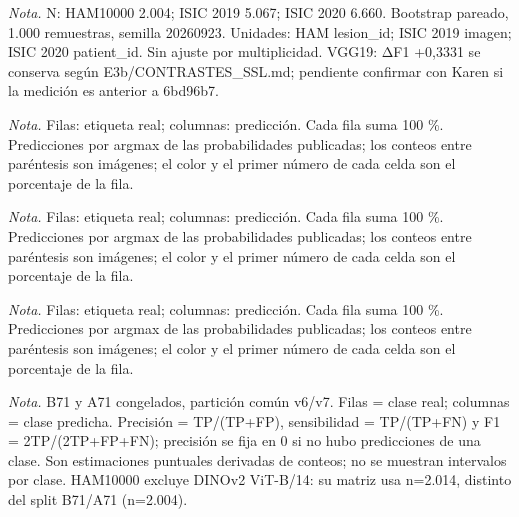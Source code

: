 \caption{C2: diferencias pareadas de F1 macro entre B71 y los controles con predicciones sobre las mismas imágenes. Panel (a), HAM10000, compara ocho baselines congelados; panel (b), ISIC, compara el control público B71.}
\textit{Nota.} N: HAM10000 2.004; ISIC 2019 5.067; ISIC 2020 6.660. Bootstrap pareado, 1.000 remuestras, semilla 20260923. Unidades: HAM lesion\_id; ISIC 2019 imagen; ISIC 2020 patient\_id. Sin ajuste por multiplicidad. VGG19: ΔF1 +0,3331 se conserva según E3b/CONTRASTES\_SSL.md; pendiente confirmar con Karen si la medición es anterior a 6bd96b7.

\caption{Matriz de confusión de B71 (propuesto) en HAM10000 (n = 2.004), evaluación congelada, normalizada por clase real.}
\textit{Nota.} Filas: etiqueta real; columnas: predicción. Cada fila suma 100 \%. Predicciones por argmax de las probabilidades publicadas; los conteos entre paréntesis son imágenes; el color y el primer número de cada celda son el porcentaje de la fila.

\caption{Matriz de confusión de B71 original (canónico, transductivo) en ISIC 2019 (n = 5.067), evaluación congelada, normalizada por clase real.}
\textit{Nota.} Filas: etiqueta real; columnas: predicción. Cada fila suma 100 \%. Predicciones por argmax de las probabilidades publicadas; los conteos entre paréntesis son imágenes; el color y el primer número de cada celda son el porcentaje de la fila.

\caption{Matriz de confusión de B71 original (canónico, transductivo) en ISIC 2020 (n = 6.660), evaluación congelada, normalizada por clase real.}
\textit{Nota.} Filas: etiqueta real; columnas: predicción. Cada fila suma 100 \%. Predicciones por argmax de las probabilidades publicadas; los conteos entre paréntesis son imágenes; el color y el primer número de cada celda son el porcentaje de la fila.

\caption{Precisión, sensibilidad y F1 por diagnóstico para B71 y A71 en la partición indicada. Con n = 2.004 en HAM10000}
\textit{Nota.} B71 y A71 congelados, partición común v6/v7. Filas = clase real; columnas = clase predicha. Precisión = TP/(TP+FP), sensibilidad = TP/(TP+FN) y F1 = 2TP/(2TP+FP+FN); precisión se fija en 0 si no hubo predicciones de una clase. Son estimaciones puntuales derivadas de conteos; no se muestran intervalos por clase. HAM10000 excluye DINOv2 ViT-B/14: su matriz usa n=2.014, distinto del split B71/A71 (n=2.004).

